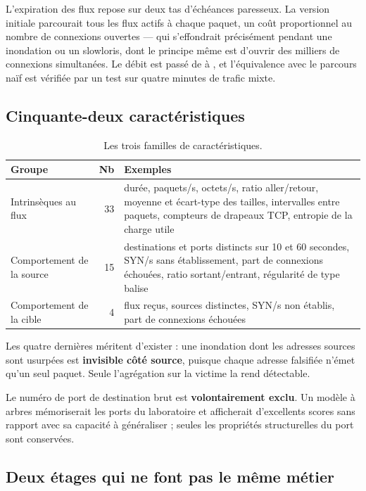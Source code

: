\documentclass[11pt,a4paper]{article}
\begin{document}
L'expiration des flux repose sur deux tas d'échéances paresseux. La version initiale parcourait tous
les flux actifs à chaque paquet, un coût proportionnel au nombre de connexions ouvertes --- qui
s'effondrait précisément pendant une inondation ou un slowloris, dont le principe même est d'ouvrir
des milliers de connexions simultanées. Le débit est passé de  à , et l'équivalence avec le parcours naïf est vérifiée par un test sur quatre
minutes de trafic mixte.

\subsection*{Cinquante-deux caractéristiques}

\begin{table}[h]\centering\small
\begin{tabularx}{\linewidth}{@{}l r X@{}}
\toprule
\textbf{Groupe} & \textbf{Nb} & \textbf{Exemples} \\
\midrule
Intrinsèques au flux & 33 & durée, paquets/s, octets/s, ratio aller/retour, moyenne et écart-type des
tailles, intervalles entre paquets, compteurs de drapeaux TCP, entropie de la charge utile \\
Comportement de la source & 15 & destinations et ports distincts sur 10 et 60 secondes, SYN/s sans
établissement, part de connexions échouées, ratio sortant/entrant, régularité de type balise \\
Comportement de la cible & 4 & flux reçus, sources distinctes, SYN/s non établis, part de connexions
échouées \\
\bottomrule
\end{tabularx}
\caption{Les trois familles de caractéristiques.}
\end{table}

Les quatre dernières méritent d'exister : une inondation dont les adresses sources sont usurpées est
\textbf{invisible côté source}, puisque chaque adresse falsifiée n'émet qu'un seul paquet. Seule
l'agrégation sur la victime la rend détectable.

Le numéro de port de destination brut est \textbf{volontairement exclu}. Un modèle à arbres
mémoriserait les ports du laboratoire et afficherait d'excellents scores sans rapport avec sa
capacité à généraliser ; seules les propriétés structurelles du port sont conservées.

\subsection*{Deux étages qui ne font pas le même métier}
\end{document}
